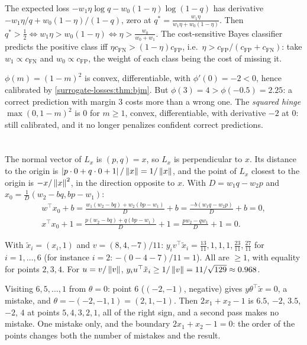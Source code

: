 The expected loss $-w_1\eta\log q - w_0(1 - \eta)\log(1 - q)$ has derivative $-w_1\eta/q + w_0(1 - \eta)/(1 - q)$, zero at
$q^* = \frac{w_1\eta}{w_1\eta + w_0(1 - \eta)}$. Then $q^*>\frac12\iff w_1\eta>w_0(1 - \eta)\iff\eta>\frac{w_0}{w_0 + w_1}$. The cost-sensitive
Bayes classifier predicts the positive class iff $\eta c_{\mathrm{FN}}>(1 - \eta)c_{\mathrm{FP}}$, i.e.\
$\eta>c_{\mathrm{FP}}/(c_{\mathrm{FP}} + c_{\mathrm{FN}})$: take $w_1\propto c_{\mathrm{FN}}$ and $w_0\propto c_{\mathrm{FP}}$, the weight of each class being
the cost of missing it.

$\phi(m) = (1 - m)^2$ is convex, differentiable, with $\phi'(0) = -2<0$, hence calibrated by
\cref{surrogate-losses:thm:bjm}. But $\phi(3) = 4>\phi(-0.5) = 2.25$: a correct prediction with margin $3$ costs
more than a wrong one. The \emph{squared hinge} $\max(0, 1 - m)^2$ is $0$ for $m\geq1$, convex, differentiable,
with derivative $-2$ at $0$: still calibrated, and it no longer penalizes confident correct
predictions.

\section{}

The normal vector of $L_x$ is $(p, q) = x$, so $L_x$ is perpendicular to $x$. Its distance to the origin is
$\left|p\cdot0 + q\cdot0 + 1\right|/\left\|x\right\| = 1/\left\|x\right\|$, and the point of $L_x$ closest to the origin is $-x/\left\|x\right\|^2$, in the
direction opposite to $x$. With $D = w_1q - w_2p$ and $x_0 = \frac1D(w_2 - bq, bp - w_1)$:
\begin{gather*}
  w^\top x_0 + b = \frac{w_1(w_2 - bq) + w_2(bp - w_1)}D + b = \frac{-b(w_1q - w_2p)}D + b = 0,\\
  x^\top x_0 + 1 = \frac{p(w_2 - bq) + q(bp - w_1)}D + 1 = \frac{pw_2 - qw_1}D + 1 = 0 .
\end{gather*}

With $\tilde x_i = (x_i, 1)$ and $v = (8, 4, -7)/11$: $y_iv^\top\tilde x_i = \frac{13}{11}, 1, 1, 1, \frac{23}{11}, \frac{27}{11}$ for $i = 1,\dots,6$ (for
instance $i = 2$: $-(0 - 4 - 7)/11 = 1$). All are $\geq1$, with equality for points $2, 3, 4$. For $u = v/\left\|v\right\|$,
$y_iu^\top\tilde x_i\geq1/\left\|v\right\| = 11/\sqrt{129}\approx0.968$.

Visiting $6, 5,\dots,1$ from $\theta = 0$: point 6 ($(-2, -1)$, negative) gives $y\theta^\top\tilde x = 0$, a mistake, and
$\theta = -(-2, -1, 1) = (2, 1, -1)$. Then $2x_1 + x_2 - 1$ is $6.5$, $-2$, $3.5$, $-2$, $4$ at points $5, 4, 3, 2, 1$, all of the
right sign, and a second pass makes no mistake. One mistake only, and the boundary
$2x_1 + x_2 - 1 = 0$: the order of the points changes both the number of mistakes and the
result.

